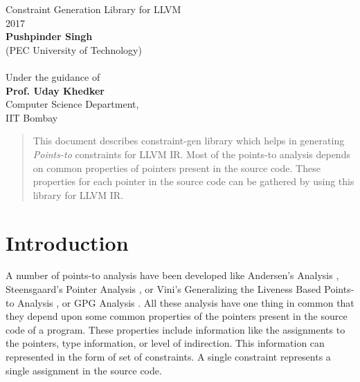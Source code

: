 \documentclass[a4paper,12pt]{report}
\begin{document}
 
\begin{titlepage}
\begin{center}
    \vspace*{\fill}
    \huge{Constraint Generation Library for LLVM}\\
    \vspace{2cm}
    \large{2017}\\


    \vspace{2cm}
    \textbf{Pushpinder Singh}\\
    (PEC University of Technology)\\

    ~\\
    Under the guidance of\\
    \textbf{Prof. Uday Khedker}\\
    Computer Science Department,\\
    IIT Bombay

    \vspace*{\fill}
\end{center}
\end{titlepage}


\begin{abstract}

This document describes constraint-gen library which helps in generating \textit{Points-to}
constraints for LLVM IR. Most of the points-to analysis depends on common
properties of pointers present in the source code. These properties for
each pointer in the source code can be gathered by using this library for
LLVM IR.

\end{abstract}

\tableofcontents

\listoftables

\chapter{Introduction}

A number of points-to analysis have been developed like Andersen's Analysis
\cite{Andersons}, Steensgaard's Pointer Analysis \cite{Steensgaard}, or Vini's
Generalizing the Liveness Based Points-to Analysis \cite{Vini:2014}, or GPG Analysis \cite{Pritams}. All these
analysis have one thing in common that they depend upon some common properties of
the pointers  present in the source code of a program. These properties include
information like the assignments to the pointers, type information, or level
of indirection. This information can represented in the form of set of constraints.
A single constraint represents a single assignment in the source code.
\end{document}

